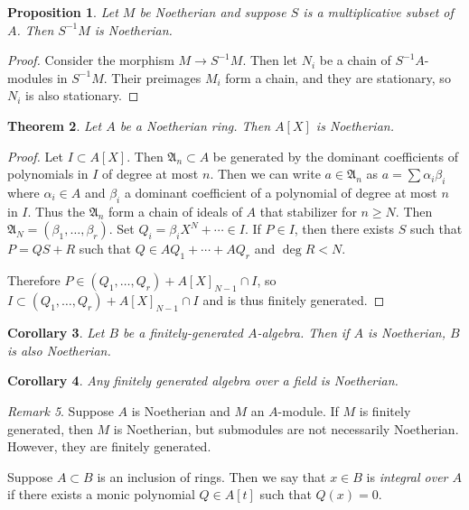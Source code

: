 \documentclass[leqno, openany]{memoir}
\newtheorem{thm}{Theorem}[section]
\newtheorem{cor}[thm]{Corollary}
\newtheorem{prop}[thm]{Proposition}
\theoremstyle{definition}
\theoremstyle{remark}
\newtheorem{rmk}[thm]{Remark}
\theoremstyle{plain}
\theoremstyle{definition}
\theoremstyle{remark}
\newcommand{\mf}[1]{\mathfrak{#1}}
\begin{document}
\begin{prop}
    Let $M$ be Noetherian and suppose $S$ is a multiplicative subset of $A$. Then $S^{-1}M$ is Noetherian.
\end{prop}

\begin{proof}
    Consider the morphism $M \to S^{-1}M$. Then let $N_i$ be a chain of $S^{-1}A$-modules in $S^{-1}M$. Their preimages $M_i$ form a chain, and they are stationary, so $N_i$ is also stationary.
\end{proof}

\begin{thm}
    Let $A$ be a Noetherian ring. Then $A[X]$ is Noetherian.
\end{thm}

\begin{proof}
    Let $I \subset A[X]$. Then $\mf{A}_n \subset A$ be generated by the dominant coefficients of polynomials in $I$ of degree at most $n$. Then we can write $a \in \mf{A}_n$ as $a = \sum \alpha_i \beta_i$ where $\alpha_i \in A$ and $\beta_i$ a dominant coefficient of a polynomial of degree at most $n$ in $I$. Thus the $\mf{A}_n$ form a chain of ideals of $A$ that stabilizer for $n \geq N$. Then $\mf{A}_N = (\beta_1, \ldots, \beta_r)$. Set $Q_i = \beta_i X^N + \cdots \in I$. If $P \in I$, then there exists $S$ such that $P = QS+R$ such that $Q \in A Q_1 + \cdots + A Q_r$ and $\deg R < N$.

    Therefore $P \in (Q_1, \ldots, Q_r) + A[X]_{N-1} \cap I$, so $I \subset (Q_1, \ldots, Q_r) + A[X]_{N-1} \cap I$ and is thus finitely generated.
\end{proof}

\begin{cor}
    Let $B$ be a finitely-generated $A$-algebra. Then if $A$ is Noetherian, $B$ is also Noetherian.
\end{cor}

\begin{cor}
    Any finitely generated algebra over a field is Noetherian.
\end{cor}

\begin{rmk}
    Suppose $A$ is Noetherian and $M$ an $A$-module. If $M$ is finitely generated, then $M$ is Noetherian, but submodules are not necessarily Noetherian. However, they are finitely generated.
\end{rmk}

Suppose $A \subset B$ is an inclusion of rings. Then we say that $x \in B$ is 
\textit{integral over $A$} if there exists a monic polynomial $Q \in A[t]$ such that $Q(x) = 0$.
\end{document}
